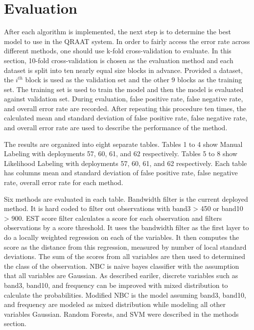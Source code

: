 \documentclass[twoside]{article}
\begin{document}

\section{Evaluation} 

After each algorithm is implemented, the next step is to determine the best model to use in the QRAAT system. In order to fairly access the error rate across different methods, one should use k-fold cross-validation to evaluate. In this section, 10-fold cross-validation is chosen as the evaluation method and each dataset is split into ten nearly equal size blocks in advance. Provided a dataset, the $i^{th}$ block is used as the validation set and the other 9 blocks as the training set. The training set is used to train the model and then the model is evaluated against validation set. During evaluation, false positive rate, false negative rate, and overall error rate are recorded. After repeating this procedure ten times, the calculated mean and standard deviation of false positive rate, false negative rate, and overall error rate are used to describe the performance of the method. 

The results are organized into eight separate tables. Tables 1 to 4 show Manual Labeling with deployments 57, 60, 61, and 62 respectively. Tables 5 to 8 show Likelihood Labeling with deployments 57, 60, 61, and 62 respectively. Each table has columns mean and standard deviation of false positive rate, false negative rate, overall error rate for each method. 

Six methods are evaluated in each table. Bandwidth filter is the current deployed method. It is hard coded to filter out observations with band3 > 450 or band10 > 900. EST score filter calculates a score for each observation and filters observations by a score threshold. It uses the bandwidth filter as the first layer to do a locally weighted regression on each of the variables. It then computes the score as the distance from this regression, measured by number of local standard deviations. The sum of the scores from all variables are then used to determined the class of the observation. NBC is naive bayes classifier with the assumption that all variables are Gaussian. As described eariler, discrete variables such as band3, band10, and frequency can be improved with mixed distribution to calculate the probabilities. Modified NBC is the model assuming band3, band10, and frequency are modeled as mixed distribution while modeling all other variables Gaussian. Random Forests, and SVM were described in the methods section.
\end{document}
